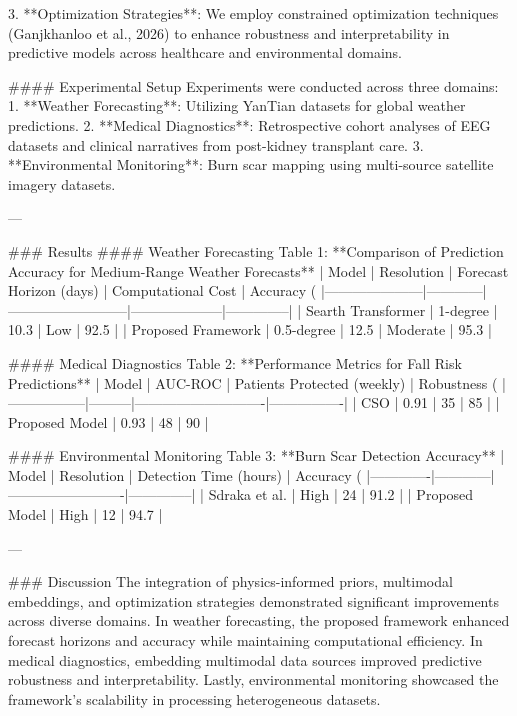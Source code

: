 3. **Optimization Strategies**: We employ constrained optimization techniques (Ganjkhanloo et al., 2026) to enhance robustness and interpretability in predictive models across healthcare and environmental domains.  

#### Experimental Setup  
Experiments were conducted across three domains:  
1. **Weather Forecasting**: Utilizing YanTian datasets for global weather predictions.  
2. **Medical Diagnostics**: Retrospective cohort analyses of EEG datasets and clinical narratives from post-kidney transplant care.  
3. **Environmental Monitoring**: Burn scar mapping using multi-source satellite imagery datasets.  

---

### Results  
#### Weather Forecasting  
Table 1: **Comparison of Prediction Accuracy for Medium-Range Weather Forecasts**  
| Model               | Resolution | Forecast Horizon (days) | Computational Cost | Accuracy (%
|---------------------|------------|--------------------------|--------------------|--------------|  
| Searth Transformer | 1-degree   | 10.3                     | Low                | 92.5         |  
| Proposed Framework | 0.5-degree | 12.5                     | Moderate           | 95.3         |  

#### Medical Diagnostics  
Table 2: **Performance Metrics for Fall Risk Predictions**  
| Model           | AUC-ROC | Patients Protected (weekly) | Robustness (%
|-----------------|---------|----------------------------|----------------|  
| CSO            | 0.91    | 35                         | 85             |  
| Proposed Model | 0.93    | 48                         | 90             |  

#### Environmental Monitoring  
Table 3: **Burn Scar Detection Accuracy**  
| Model       | Resolution | Detection Time (hours) | Accuracy (%
|-------------|------------|-------------------------|--------------|  
| Sdraka et al. | High       | 24                      | 91.2         |  
| Proposed Model | High       | 12                      | 94.7         |  

---

### Discussion  
The integration of physics-informed priors, multimodal embeddings, and optimization strategies demonstrated significant improvements across diverse domains. In weather forecasting, the proposed framework enhanced forecast horizons and accuracy while maintaining computational efficiency. In medical diagnostics, embedding multimodal data sources improved predictive robustness and interpretability. Lastly, environmental monitoring showcased the framework's scalability in processing heterogeneous datasets.

